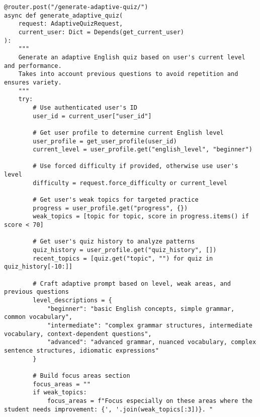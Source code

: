 \documentclass[12pt,a4paper]{article}
\begin{document}
\begin{lstlisting}[style=pythonstyle, caption=Generatore Quiz AI - Logica Adattiva, label=lst:quizgen]
@router.post("/generate-adaptive-quiz/")
async def generate_adaptive_quiz(
    request: AdaptiveQuizRequest,
    current_user: Dict = Depends(get_current_user)
):
    """
    Generate an adaptive English quiz based on user's current level and performance.
    Takes into account previous questions to avoid repetition and ensures variety.
    """
    try:
        # Use authenticated user's ID
        user_id = current_user["user_id"]
        
        # Get user profile to determine current English level
        user_profile = get_user_profile(user_id)
        current_level = user_profile.get("english_level", "beginner")
        
        # Use forced difficulty if provided, otherwise use user's level
        difficulty = request.force_difficulty or current_level
        
        # Get user's weak topics for targeted practice
        progress = user_profile.get("progress", {})
        weak_topics = [topic for topic, score in progress.items() if score < 70]
        
        # Get user's quiz history to analyze patterns
        quiz_history = user_profile.get("quiz_history", [])
        recent_topics = [quiz.get("topic", "") for quiz in quiz_history[-10:]]
        
        # Craft adaptive prompt based on level, weak areas, and previous questions
        level_descriptions = {
            "beginner": "basic English concepts, simple grammar, common vocabulary",
            "intermediate": "complex grammar structures, intermediate vocabulary, context-dependent questions",
            "advanced": "advanced grammar, nuanced vocabulary, complex sentence structures, idiomatic expressions"
        }
        
        # Build focus areas section
        focus_areas = ""
        if weak_topics:
            focus_areas = f"Focus especially on these areas where the student needs improvement: {', '.join(weak_topics[:3])}. "
\end{lstlisting}
\end{document}
